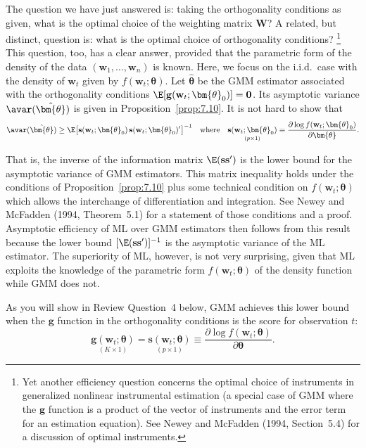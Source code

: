 The question we have just answered is: taking the orthogonality conditions as given, what is the optimal choice of the weighting matrix $\mathbf{W}$? A related, but distinct, question is: what is the optimal choice of orthogonality conditions?%
\footnote{Yet another efficiency question concerns the optimal choice of instruments in generalized nonlinear instrumental estimation (a special case of GMM where the $\mathbf{g}$ function is a product of the vector of instruments and the error term for an estimation equation). See Newey and McFadden (1994, Section~5.4) for a discussion of optimal instruments.}
This question, too, has a clear answer, provided that the parametric form of the density of the data $(\mathbf{w}_1, \ldots, \mathbf{w}_n)$ is known. Here, we focus on the i.i.d.\ case with the density of $\mathbf{w}_t$ given by $f(\mathbf{w}_t; \bm{\theta})$. Let $\hat{\bm{\theta}}$ be the GMM estimator associated with the orthogonality conditions $\E[\mathbf{g}(\mathbf{w}_t; \bm{\theta}_0)] = \mathbf{0}$. Its asymptotic variance $\avar(\hat{\bm{\theta}})$ is given in Proposition~\ref{prop:7.10}. It is not hard to show that
\begin{equation}
\label{eq:7.3.37}
\avar(\hat{\bm{\theta}}) \geq \E\bigl[\mathbf{s}(\mathbf{w}_t; \bm{\theta}_0)\,\mathbf{s}(\mathbf{w}_t; \bm{\theta}_0)'\bigr]^{-1} \quad \text{where} \quad \underset{(p \times 1)}{\mathbf{s}(\mathbf{w}_t; \bm{\theta}_0)} \equiv \frac{\partial\log f(\mathbf{w}_t; \bm{\theta}_0)}{\partial\bm{\theta}}.
\end{equation}

That is, the inverse of the information matrix $\E(\mathbf{s}\mathbf{s}')$ is the lower bound for the asymptotic variance of GMM estimators. This matrix inequality holds under the conditions of Proposition~\ref{prop:7.10} plus some technical condition on $f(\mathbf{w}_t; \bm{\theta})$ which allows the interchange of differentiation and integration. See Newey and McFadden (1994, Theorem~5.1) for a statement of those conditions and a proof. Asymptotic efficiency of ML over GMM estimators then follows from this result because the lower bound $[\E(\mathbf{s}\mathbf{s}')]^{-1}$ is the asymptotic variance of the ML estimator. The superiority of ML, however, is not very surprising, given that ML exploits the knowledge of the parametric form $f(\mathbf{w}_t; \bm{\theta})$ of the density function while GMM does not.

As you will show in Review Question~4 below, GMM achieves this lower bound when the $\mathbf{g}$ function in the orthogonality conditions is the score for observation $t$:
\begin{equation}
\label{eq:7.3.38}
\underset{(K \times 1)}{\mathbf{g}(\mathbf{w}_t; \bm{\theta})} = \underset{(p \times 1)}{\mathbf{s}(\mathbf{w}_t; \bm{\theta})} \equiv \frac{\partial\log f(\mathbf{w}_t; \bm{\theta})}{\partial\bm{\theta}}.
\end{equation}

